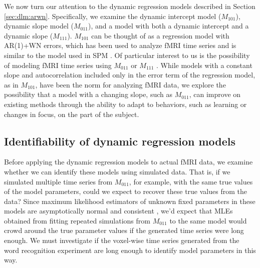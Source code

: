We now turn our attention to the dynamic regression models described in Section \ref{sec:dlm:arwn}. Specifically, we examine the dynamic intercept model ($M_{101}$), dynamic slope model ($M_{011}$), and a model with both a dynamic intercept and a dynamic slope ($M_{111}$). $M_{101}$ can be thought of as a regression model with AR(1)+WN errors, which has been used to analyze fMRI time series \citep{purdon:weiss:fpr:1998,burock:dale:fpr:2000} and is similar to the model used in SPM \citep{kiebel:holmes:spm:2007}. Of particular interest to us is the possibility of modeling fMRI time series using $M_{011}$ or $M_{111}$ . While models with a constant slope and autocorrelation included only in the error term of the regression model, as in $M_{101}$, have been the norm for analyzing fMRI data, we explore the possibility that a model with a changing slope, such as $M_{011}$, can improve on existing methods through the ability to adapt to behaviors, such as learning or changes in focus, on the part of the subject.

\subsection{Identifiability of dynamic regression models \label{sec:fmri:id}}

Before applying the dynamic regression models to actual fMRI data, we examine whether we can identify these models using simulated data. That is, if we simulated multiple time series from $M_{011}$, for example, with the same true values of the model parameters, could we expect to recover these true values from the data? Since maximum likelihood estimators of unknown fixed parameters in these models are asymptotically normal and consistent \cite[Section 10.1][]{casella:berger:2002}, we'd expect that MLEs obtained from fitting repeated simulations from $M_{011}$ to the same model would crowd around the true parameter values if the generated time series were long enough. We must investigate if the voxel-wise time series generated from the word recognition experiment are long enough to identify model parameters in this way.

